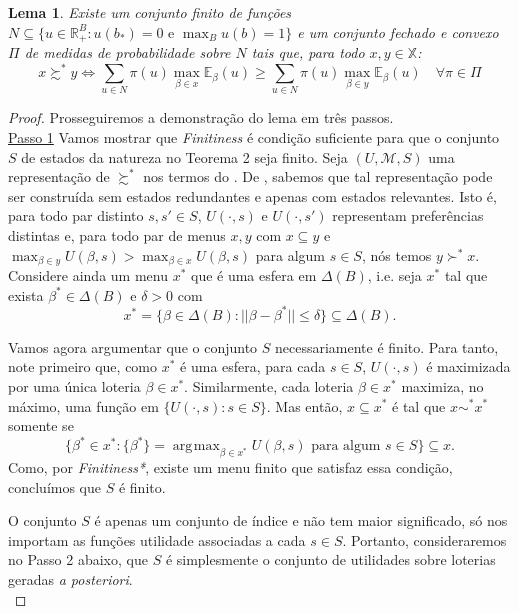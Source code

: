 \documentclass[11pt, a4paper]{article}
\theoremstyle{nonumberplain}
\newtheorem{proof}{Dem.}
\theoremstyle{plain}
\theoremstyle{plain}
\theoremstyle{plain}
\newtheorem{lemma}{Lema}
\DeclareMathOperator*{\argmax}{\arg\!\max}
\begin{document}
\begin{lemma}\label{nossoKochov} Existe um conjunto finito de funções $N\subseteq\{u \in \mathbb{R}^B_+:u(b_*)=0\text { e }\max_{B}u(b)=1\}$ e um conjunto fechado e convexo $\Pi$ de medidas de probabilidade sobre $N$ tais que, para todo $x,y\in\mathbb{X}$:
$$x\succsim^* y \Leftrightarrow \sum_{u\in N} \pi(u)\max_{\beta\in x}\mathbb{E}_\beta(u) \geq \sum_{u\in N} \pi(u)\max_{\beta\in y}\mathbb{E}_\beta(u)\quad \forall\pi\in\Pi$$  
     
\end{lemma}
\begin{proof}

Prosseguiremos a demonstração do lema em três passos.\\
\underline{Passo 1} Vamos mostrar que \emph{Finitiness} é condição suficiente para que o conjunto $S$ de estados da natureza no Teorema 2 seja finito. Seja $(U,\mathcal{M},S)$ uma representação de $\succsim^*$ nos termos do . De \cite{Kochov2007}, sabemos que tal representação pode ser construída sem estados redundantes e apenas com estados relevantes. Isto é, para todo par distinto $s,s'\in S$, $U(\cdot,s)$ e $U(\cdot,s')$ representam preferências distintas e, para todo par de menus $x,y$ com $x\subseteq y$ e $\max_{\beta \in y}U(\beta,s)>\max_{\beta \in x}U(\beta,s)$ para algum $s\in S$, nós temos $y\succ^* x$. Considere ainda um menu $x^*$ que é uma esfera em $\Delta (B)$, i.e. seja $x^*$ tal que exista $\beta^*\in\Delta(B)$ e $\delta>0$ com $$x^*=\{\beta\in\Delta(B):||\beta-\beta^*||\leq\delta\}\subseteq\Delta(B).$$ 

Vamos agora argumentar que o conjunto $S$ necessariamente é finito. Para tanto, note primeiro que, como $x^*$ é uma esfera, para cada $s\in S$, $U(\cdot,s)$ é maximizada por uma única loteria $\beta\in x^*$. Similarmente, cada loteria $\beta\in x^*$ maximiza, no máximo, uma função em  $\{U(\cdot,s): s\in S\}$. Mas então, $x\subseteq x^*$ é tal que $x\sim^* x^*$ somente se $$\{\beta^* \in x^* : \{\beta^*\}=\argmax_{\beta\in x^*} U(\beta,s)\text{ para algum }s\in S\} \subseteq x.$$ Como, por \emph{Finitiness*}, existe um menu finito que satisfaz essa condição, concluímos que $S$ é finito.

O conjunto $S$ é apenas um conjunto de índice e não tem maior significado, só nos importam as funções utilidade associadas a cada $s\in S$. Portanto, consideraremos no Passo 2 abaixo, que $S$ é simplesmente o conjunto de utilidades sobre loterias geradas \emph{a posteriori}.
\\


\end{proof}
\end{document}
